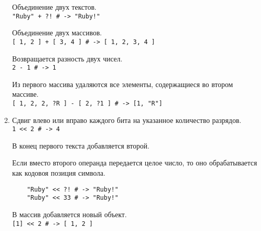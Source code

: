 \begin{enumerate}
  \begin{operator}
    Объединение двух текстов.
    \\\verb|"Ruby" + ?! # -> "Ruby!"|
  \end{operator}

  \begin{operator}
    Объединение двух массивов.
    \\\verb![ 1, 2 ] + [ 3, 4 ] # -> [ 1, 2, 3, 4 ]!
  \end{operator}

  \begin{operator}
    Возвращается разность двух чисел.
    \\\verb!2 - 1 # -> 1!
  \end{operator}

  \begin{operator}
    Из первого массива удаляются все элементы, содержащиеся во втором массиве.
    \\\verb![ 1, 2, 2, ?R ] - [ 2, ?1 ] # -> [1, "R"]!
  \end{operator}

  \item %
  \begin{operator}
    Сдвиг влево или вправо каждого бита на указанное количество разрядов.
    \\\verb!1 << 2 # -> 4!
  \end{operator}

  \begin{operator}
    В конец первого текста добавляется второй. 

    Если вместо второго операнда передается целое число, то оно обрабатывается как кодовоя позиция символа.
    \begin{verbatim}
    "Ruby" << ?! # -> "Ruby!"
    "Ruby" << 33 # -> "Ruby!"
    \end{verbatim}
  \end{operator}

  \begin{operator}
    В массив добавляется новый объект.
    \\\verb![1] << 2 # -> [ 1, 2 ]!
  \end{operator}


\end{enumerate}
